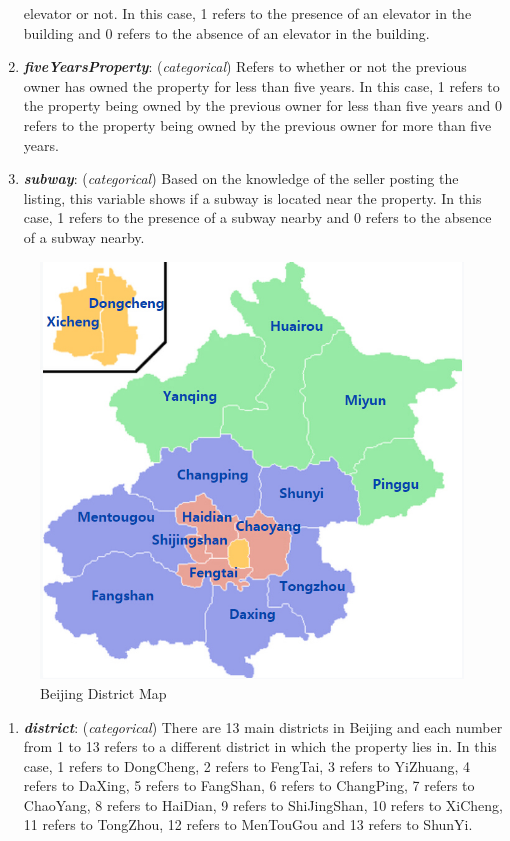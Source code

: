 \documentclass[
]{article}
\providecommand{\tightlist}{%
  \setlength{\itemsep}{0pt}\setlength{\parskip}{0pt}}
\begin{document}
\begin{enumerate}
  elevator or not. In this case, 1 refers to the presence of an elevator
  in the building and 0 refers to the absence of an elevator in the
  building.
\item
  \textbf{\emph{fiveYearsProperty}}: (\emph{categorical}) Refers to
  whether or not the previous owner has owned the property for less than
  five years. In this case, 1 refers to the property being owned by the
  previous owner for less than five years and 0 refers to the property
  being owned by the previous owner for more than five years.
\item
  \textbf{\emph{subway}}: (\emph{categorical}) Based on the knowledge of
  the seller posting the listing, this variable shows if a subway is
  located near the property. In this case, 1 refers to the presence of a
  subway nearby and 0 refers to the absence of a subway nearby.
\end{enumerate}

\begin{figure}
\includegraphics[width=0.5\linewidth]{beijing_map} \caption{Beijing District Map}\label{fig:pressure}
\end{figure}

\begin{enumerate}
\def\labelenumi{\arabic{enumi}.}
\setcounter{enumi}{14}
\tightlist
\item
  \textbf{\emph{district}}: (\emph{categorical}) There are 13 main
  districts in Beijing and each number from 1 to 13 refers to a
  different district in which the property lies in. In this case, 1
  refers to DongCheng, 2 refers to FengTai, 3 refers to YiZhuang, 4
  refers to DaXing, 5 refers to FangShan, 6 refers to ChangPing, 7
  refers to ChaoYang, 8 refers to HaiDian, 9 refers to ShiJingShan, 10
  refers to XiCheng, 11 refers to TongZhou, 12 refers to MenTouGou and
  13 refers to ShunYi.
\end{enumerate}
\end{document}
